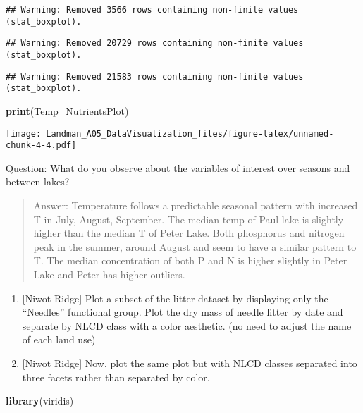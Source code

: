 \documentclass[]{article}
\newenvironment{Shaded}{\begin{snugshade}}{\end{snugshade}}
\newcommand{\KeywordTok}[1]{\textcolor[rgb]{0.13,0.29,0.53}{\textbf{#1}}}
\newcommand{\NormalTok}[1]{#1}
\begin{document}
\begin{verbatim}
## Warning: Removed 3566 rows containing non-finite values (stat_boxplot).
\end{verbatim}

\begin{verbatim}
## Warning: Removed 20729 rows containing non-finite values (stat_boxplot).
\end{verbatim}

\begin{verbatim}
## Warning: Removed 21583 rows containing non-finite values (stat_boxplot).
\end{verbatim}

\begin{Shaded}
\begin{Highlighting}[]
\KeywordTok{print}\NormalTok{(Temp_NutrientsPlot)}
\end{Highlighting}
\end{Shaded}

\texttt{[image: Landman\_A05\_DataVisualization\_files/figure-latex/unnamed-chunk-4-4.pdf]}

Question: What do you observe about the variables of interest over
seasons and between lakes?

\begin{quote}
Answer: Temperature follows a predictable seasonal pattern with
increased T in July, August, September. The median temp of Paul lake is
slightly higher than the median T of Peter Lake. Both phosphorus and
nitrogen peak in the summer, around August and seem to have a similar
pattern to T. The median concentration of both P and N is higher
slightly in Peter Lake and Peter has higher outliers.
\end{quote}

\begin{enumerate}
\def\labelenumi{\arabic{enumi}.}
\setcounter{enumi}{5}
\item
  {[}Niwot Ridge{]} Plot a subset of the litter dataset by displaying
  only the ``Needles'' functional group. Plot the dry mass of needle
  litter by date and separate by NLCD class with a color aesthetic. (no
  need to adjust the name of each land use)
\item
  {[}Niwot Ridge{]} Now, plot the same plot but with NLCD classes
  separated into three facets rather than separated by color.
\end{enumerate}

\begin{Shaded}
\begin{Highlighting}[]
\KeywordTok{library}\NormalTok{(viridis)}
\end{Highlighting}
\end{Shaded}
\end{document}
